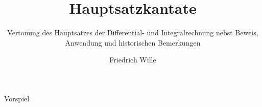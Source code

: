 




\normalmusicsize

\subtitle{Vertonung des Hauptsatzes der Differential- und Integralrechnung nebst Beweis, Anwendung und historischen Bemerkungen}
\author{Friedrich Wille}
\title{Hauptsatzkantate}
\maketitle

Vorspiel

\bye
